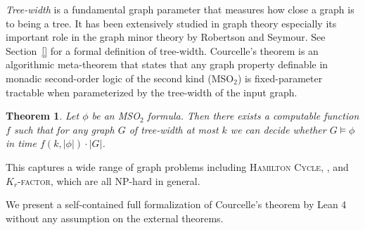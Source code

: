 \documentclass[11pt]{article}
\theoremstyle{plain}
\newtheorem{theorem}{Theorem}[section]
\theoremstyle{definition}
\begin{document}
\emph{Tree-width} is a fundamental graph parameter that measures how close a graph is to being a tree.
It has been extensively studied in graph theory especially its important role in the graph minor theory by Robertson and Seymour.
See Section~\ref{} for a formal definition of tree-width.
Courcelle's theorem is an algorithmic meta-theorem that states that any graph property definable in monadic second-order logic of the second kind (MSO$_2$) is fixed-parameter tractable when parameterized by the tree-width of the input graph.
\begin{theorem}
    Let $\phi$ be an MSO$_2$ formula. Then there exists a computable function $f$ such that for any graph $G$ of tree-width at most $k$ we can decide whether $G \models \phi$ in time $f(k, |\phi|) \cdot |G|$.
\end{theorem}
This captures a wide range of graph problems including \textsc{Hamilton Cycle}, , and \textsc{$K_r$-factor}, which are all NP-hard in general.

We present a self-contained full formalization of Courcelle's theorem by Lean 4 without any assumption on the external theorems.
\end{document}
